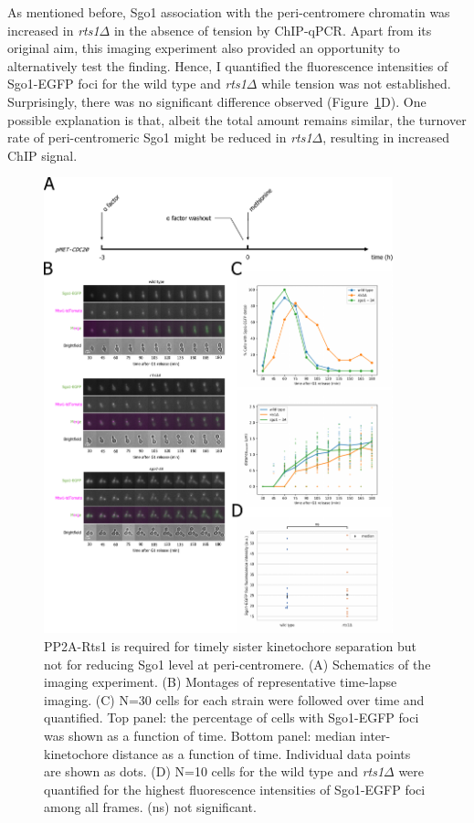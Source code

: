 As mentioned before, Sgo1 association with the peri-centromere chromatin was increased in \textit{rts1$\Delta$} in the absence of tension by ChIP-qPCR. Apart from its original aim, this imaging experiment also provided an opportunity to alternatively test the finding. Hence, I quantified the fluorescence intensities of Sgo1-EGFP foci for the wild type and \textit{rts1$\Delta$} while tension was not established. Surprisingly, there was no significant difference observed (Figure~\ref{fig:sgo1rts1mutants}D). One possible explanation is that, albeit the total amount remains similar, the turnover rate of peri-centromeric Sgo1 might be reduced in \textit{rts1$\Delta$}, resulting in increased ChIP signal. 

\begin{figure}[htbp]
  \centering
  \includegraphics[width=0.9\textwidth]{chapter3/figures/Sgo1 rts1 mutants.pdf}
  \caption[PP2A-Rts1 is required for timely sister kinetochore separation but not for reducing Sgo1 level at peri-centromere]{PP2A-Rts1 is required for timely sister kinetochore separation but not for reducing Sgo1 level at peri-centromere. (A) Schematics of the imaging experiment. (B) Montages of representative time-lapse imaging. (C) N=30 cells for each strain were followed over time and quantified. Top panel: the percentage of cells with Sgo1-EGFP foci was shown as a function of time. Bottom panel: median inter-kinetochore distance as a function of time. Individual data points are shown as dots. (D) N=10 cells for the wild type and \textit{rts1$\Delta$} were quantified for the highest fluorescence intensities of Sgo1-EGFP foci among all frames. (ns) not significant.}
  \label{fig:sgo1rts1mutants}
\end{figure}

